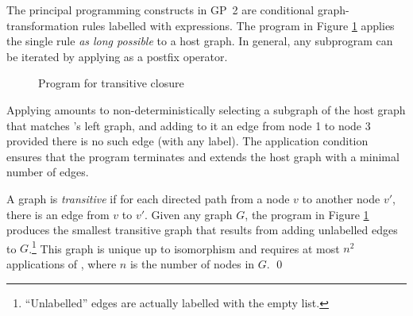 \begin{example}
The principal programming constructs in GP~2 are conditional graph-transformation rules labelled with expressions. The program in Figure \ref{fig:transitive-closure} applies the single rule  \emph{as long possible} to a host graph. In general, any subprogram can be iterated by applying \ttt{!} as a postfix operator.

\begin{figure}[htb]
\begin{center}
 
\end{center}
\caption{Program for transitive closure}\label{fig:transitive-closure}
\end{figure}

Applying  amounts to non-deterministically selecting a subgraph of the host graph that matches 's left graph, and adding to it an edge from node 1 to node 3 provided there is no such edge (with any label). The application condition ensures that the program terminates and extends the host graph with a minimal number of edges.

A graph is \emph{transitive} if for each directed path from a node $v$ to another node $v'$, there is an edge from $v$ to $v'$.  Given any graph $G$, the program in Figure \ref{fig:transitive-closure} produces the smallest transitive graph that results from adding unlabelled edges to $G$.\footnote{``Unlabelled'' edges are actually labelled with the empty list.} This graph is unique up to isomorphism and requires at most $n^2$ applications of , where $n$\/ is the number of nodes in $G$. \qed
\end{example}
  

